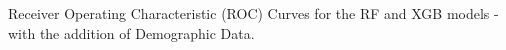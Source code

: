 Receiver Operating Characteristic (ROC) Curves for the RF and XGB models - with the addition of Demographic Data.
\label{fig:RFROC}